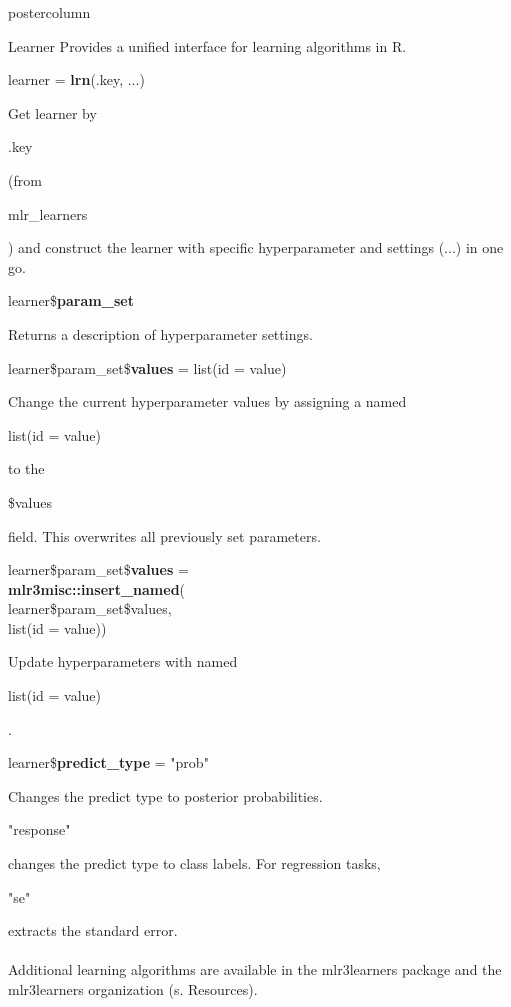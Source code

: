 \documentclass{beamer}
\newlength{\columnheight} %
\newcommand{\codeinline}[1]{\begin{codeboxinline}#1\end{codeboxinline}}
\begin{document}
\begin{frame}[fragile]{}
\begin{columns}
\begin{column}{.245\textwidth}
\begin{beamercolorbox}[center]{postercolumn}
\begin{minipage}{.98\textwidth}
					\parbox[t][\columnheight]{\textwidth}{
						\begin{myblock}{Learner}
						Provides a unified interface for learning algorithms in R.
						\\
						\begin{codebox}
							learner = \textbf{lrn}(.key, ...)
						\end{codebox}
						Get learner by \codeinline{.key} (from \codeinline{mlr\_learners}) and construct the learner with specific hyperparameter and settings (...) in one go.
						\\
						\vspace{1em}
						\begin{codebox}
							learner\$\textbf{param\_set}
						\end{codebox}
						Returns a description of hyperparameter settings.	
						\\
						\begin{codebox}
							learner\$param\_set\$\textbf{values} = list(id = value)
						\end{codebox}
						Change the current hyperparameter values by assigning a named \codeinline{list(id = value)} to the \codeinline{\$values} field.
						This overwrites all previously set parameters.	
						\\
						\begin{codeboxmultiline}[width=27cm]
							learner\$param\_set\$\textbf{values} = \\
							\hspace*{1ex} \textbf{mlr3misc::insert\_named}(\\
							\hspace*{2ex} learner\$param\_set\$values,
\\
							\hspace*{2ex} list(id = value))
						\end{codeboxmultiline}
						Update hyperparameters with named \codeinline{list(id = value)}.
						\\
						\begin{codebox}
							learner\$\textbf{predict\_type} = "prob"
						\end{codebox}
						Changes the predict type to posterior probabilities. 
						\codeinline{"response"} changes the predict type to class labels.
						For regression tasks, \codeinline{"se"} extracts the standard error.
						\\
						\\
						Additional learning algorithms are available in the mlr3learners package and the mlr3learners organization (s. Resources).

\end{myblock}}
\end{minipage}
\end{beamercolorbox}
\end{column}
\end{columns}
\end{frame}
\end{document}
